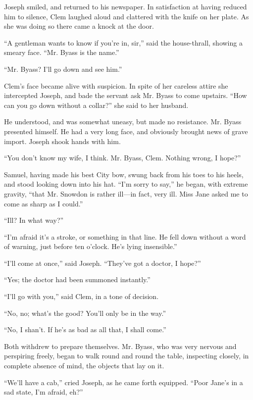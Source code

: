 Joseph smiled, and returned to his newspaper. In satisfaction at having
reduced him to silence, Clem laughed aloud and clattered with the knife
on her plate. As she was doing so there came a knock at the door.

``A gentleman wants to know if you're in, sir,'' said the house-thrall,
showing a smeary face. ``Mr. Byass is the name.''

``Mr. Byass? I'll go down and see him.''

Clem's face became alive with suspicion. In spite of her careless attire
she intercepted Joseph, and bade the servant ask Mr. Byass to come
upstairs. ``How can you go down without a collar?'' she said to her
husband.

{\protect\hypertarget{160}{}{}}He understood, and was somewhat uneasy,
but made no resistance. Mr. Byass presented himself. He had a very long
face, and obviously brought news of grave import. Joseph shook hands
with him.

``You don't know my wife, I think. Mr. Byass, Clem. Nothing wrong, I
hope?''

Samuel, having made his best City bow, swung back from his toes to his
heels, and stood looking down into his hat. ``I'm sorry to say,'' he
began, with extreme gravity, ``that Mr. Snowdon is rather ill---in fact,
very ill. Miss Jane asked me to come as sharp as I could.''

``Ill? In what way?''

``I'm afraid it's a stroke, or something in that line. He fell down
without a word of warning, just before ten o'clock. He's lying
insensible.''

``I'll come at once,'' said Joseph. ``They've got a doctor, I hope?''

``Yes; the doctor had been summoned instantly.''

``I'll go with you,'' said Clem, in a tone of decision.

``No, no; what's the good? You'll only be in the way.''

{\protect\hypertarget{161}{}{}}``No, I shan't. If he's as bad as all
that, I shall come.''

Both withdrew to prepare themselves. Mr. Byass, who was very nervous and
perspiring freely, began to walk round and round the table, inspecting
closely, in complete absence of mind, the objects that lay on it.

``We'll have a cab,'' cried Joseph, as he came forth equipped. ``Poor
Jane's in a sad state, I'm afraid, eh?''

